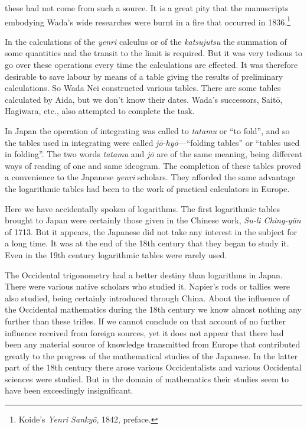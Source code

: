 \documentclass[11pt]{article}
\newcommand{\scanpage}[2]{\clearpage\setcounter{footnote}{0}\noindent{\footnotesize\color{gray}PDF page #1 · #2}\par\medskip}
\newcommand{\scanfooter}{}
\begin{document}
\scanpage{0188}{Chapter 22, printed page 174}
these had not come from such a source. It is a great pity that the manuscripts embodying Wada's wide researches were burnt in a fire that occurred in 1836.\footnote{Koide's \emph{Yenri Sankyō}, 1842, preface.}

In the calculations of the \emph{yenri} calculus or of the \emph{katsujutsu} the summation of some quantities and the transit to the limit is required. But it was very tedious to go over these operations every time the calculations are effected. It was therefore desirable to save labour by means of a table giving the results of preliminary calculations. So Wada Nei constructed various tables. There are some tables calculated by Aida, but we don't know their dates. Wada's successors, Saitō, Hagiwara, etc., also attempted to complete the task.

In Japan the operation of integrating was called to \emph{tatamu} or ``to fold'', and so the tables used in integrating were called \emph{jō-hyō}---``folding tables'' or ``tables used in folding''. The two words \emph{tatamu} and \emph{jō} are of the same meaning, being different ways of reading of one and same ideogram. The completion of these tables proved a convenience to the Japanese \emph{yenri} scholars. They afforded the same advantage the logarithmic tables had been to the work of practical calculators in Europe.

Here we have accidentally spoken of logarithms. The first logarithmic tables brought to Japan were certainly those given in the Chinese work, \emph{Su-li Ching-yün} of 1713. But it appears, the Japanese did not take any interest in the subject for a long time. It was at the end of the 18th century that they began to study it. Even in the 19th century logarithmic tables were rarely used.

The Occidental trigonometry had a better destiny than logarithms in Japan. There were various native scholars who studied it. Napier's rods or tallies were also studied, being certainly introduced through China. About the influence of the Occidental mathematics during the 18th century we know almost nothing any further than these trifles. If we cannot conclude on that account of no further influence received from foreign sources, yet it does not appear that there had been any material source of knowledge transmitted from Europe that contributed greatly to the progress of the mathematical studies of the Japanese. In the latter part of the 18th century there arose various Occidentalists and various Occidental sciences were studied. But in the domain of mathematics their studies seem to have been exceedingly insignificant.
\scanfooter
\end{document}
